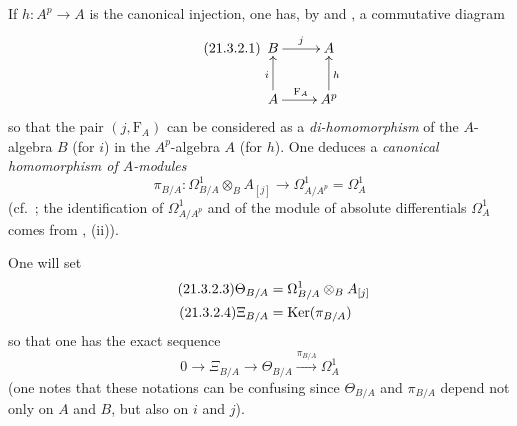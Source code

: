 \begin{env}[21.3.2]
\label{0.21.3.2}
If $h:A^p\to A$ is the canonical injection, one has, by  and , a commutative diagram
\begin{equation}
\tag{21.3.2.1}
  \label{0.21.3.2.1}
\xymatrix{
  B \ar[r]^{j} & A \\
  A \ar[u]^{i} \ar[r]^{\mathrm{F}_A} & A^p \ar[u]_{h}
}
\end{equation}
so that the pair $(j,\mathrm{F}_A)$ can be considered as a \emph{di-homomorphism} of the $A$-algebra $B$ (for $i$) in the $A^p$-algebra $A$ (for $h$).
One deduces a \emph{canonical homomorphism of $A$-modules}
\begin{equation}
\tag{21.3.2.2}
  \label{0.21.3.2.2}
  \pi_{B/A}:\Omega^1_{B/A}\otimes_B A_{[j]}\to\Omega^1_{A/A^p}=\Omega^1_A
\end{equation}
(cf.\ ; the identification of $\Omega^1_{A/A^p}$ and of the module of absolute differentials $\Omega^1_A$ comes from , (ii)).

One will set
\begin{align}
\tag{21.3.2.3}
  \label{0.21.3.2.3}
  \Theta_{B/A}&=\Omega^1_{B/A}\otimes_B A_{[j]} \\
\tag{21.3.2.4}
  \label{0.21.3.2.4}
  \Xi_{B/A}&=\operatorname{Ker}(\pi_{B/A})
\end{align}
so that one has the exact sequence
\begin{equation}
\tag{21.3.2.5}
  \label{0.21.3.2.5}
  0\to\Xi_{B/A}\to\Theta_{B/A}\xrightarrow{\pi_{B/A}}\Omega^1_A
\end{equation}
(one notes that these notations can be confusing since $\Theta_{B/A}$ and $\pi_{B/A}$ depend not only on $A$ and $B$, but also on $i$ and $j$).
\end{env}

